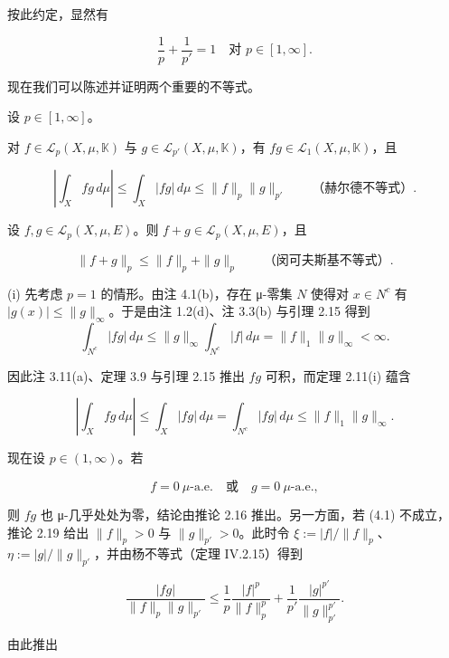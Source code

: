 按此约定，显然有

\[
\frac{1}{p} + \frac{1}{p'} = 1 \quad \text{对 } p \in [1,\infty] .
\]

现在我们可以陈述并证明两个重要的不等式。

\begin{theorem}

设 $ p \in [1,\infty] $。

\begin{subitems}
\item

对 $ f \in \mathcal{L}_p(X,\mu,\mathbb{K}) $ 与 $ g \in \mathcal{L}_{p'}(X,\mu,\mathbb{K}) $，有 $ fg \in \mathcal{L}_1(X,\mu,\mathbb{K}) $，且

\[
\left|\int_X fg\,d\mu\right| \le \int_X |fg|\,d\mu \le \|f\|_p\|g\|_{p'} \qquad \text{（赫尔德不等式）} .
\]
\item

设 $ f, g \in \mathcal{L}_p(X,\mu,E) $。则 $ f + g \in \mathcal{L}_p(X,\mu,E) $，且

\[
\|f + g\|_p \le \|f\|_p + \|g\|_p \qquad \text{（闵可夫斯基不等式）} .
\]

\proofhead
(i) 先考虑 $ p = 1 $ 的情形。由注 4.1(b)，存在 μ-零集 $ N $ 使得对 $ x \in N^c $ 有 $ |g(x)| \le \|g\|_\infty $。于是由注 1.2(d)、注 3.3(b) 与引理 2.15 得到
\[
\int_{N^c}|fg|\,d\mu \le \|g\|_\infty \int_{N^c}|f|\,d\mu = \|f\|_1\|g\|_\infty < \infty .
\]

因此注 3.11(a)、定理 3.9 与引理 2.15 推出 $ fg $ 可积，而定理 2.11(i) 蕴含

\[
\left|\int_X fg\,d\mu\right| \le \int_X |fg|\,d\mu = \int_{N^c}|fg|\,d\mu \le \|f\|_1\|g\|_\infty .
\]

现在设 $ p \in (1,\infty) $。若

\begin{equation}
f = 0 \ \mu\text{-a.e.} \quad \text{或} \quad g = 0 \ \mu\text{-a.e.},\tag{4.1}
\end{equation}

则 $ fg $ 也 μ-几乎处处为零，结论由推论 2.16 推出。另一方面，若 (4.1) 不成立，推论 2.19 给出 $ \|f\|_p > 0 $ 与 $ \|g\|_{p'} > 0 $。此时令 $ \xi := |f|/\|f\|_p $、$ \eta := |g|/\|g\|_{p'} $，并由杨不等式（定理 IV.2.15）得到

\[
\frac{|fg|}{\|f\|_p\|g\|_{p'}} \le \frac{1}{p}\frac{|f|^p}{\|f\|_p^p} + \frac{1}{p'}\frac{|g|^{p'}}{\|g\|_{p'}^{p'}} .
\]

由此推出


\end{subitems}
\end{theorem}

